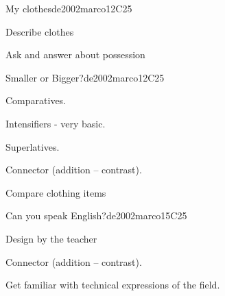 \begin{syllabus}
\begin{unit}{My clothes}{}{de2002marco}{12}{C25}
   \begin{learningoutcomes}
      \item Describe clothes
      \item Ask and answer about possession
   \end{learningoutcomes}

\end{unit}

\begin{unit}{Smaller or Bigger?}{}{de2002marco}{12}{C25}
   \begin{topics}
      \item Comparatives.
      \item Intensifiers - very basic.
      \item Superlatives.
      \item Connector (addition – contrast).
   \end{topics}

   \begin{learningoutcomes}
      \item Compare clothing items
   \end{learningoutcomes}
\end{unit}

\begin{unit}{Can you speak English?}{}{de2002marco}{15}{C25}
   \begin{topics}
      \item Design by the teacher
      \item Connector (addition – contrast).
   \end{topics}

   \begin{learningoutcomes}
      \item Get familiar with technical expressions of the field.
   \end{learningoutcomes}
\end{unit}

\begin{coursebibliography}
\end{coursebibliography}
\end{syllabus}
%
